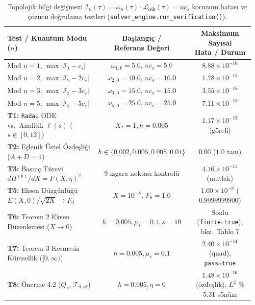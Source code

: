 \documentclass[12pt,a4paper]{article}
\begin{document}
\begin{table}[htbp]
\centering
\footnotesize
\setlength{\tabcolsep}{1pt}
\caption{Topolojik bilgi değişmezi $\mathcal{I}_n(\tau) = \omega_n(\tau) \cdot \mathcal{L}_{\mathrm{isik}}(\tau) = n c_s$ korunum hatası ve çözücü doğrulama testleri (\texttt{solver\_engine.run\_verification()}).}
\vspace{0.15cm}
\begin{tabularx}{\textwidth}{@{}X|c|c@{}}
\hline
Test / Kuantum Modu ($n$) & \shortstack{Başlangıç / \\ Referans Değeri} & \shortstack{Maksimum Sayısal \\ Hata / Durum} \\
\hline
Mod $n=1$, $\max|\mathcal{I}_1-c_s|$ & $\omega_{1,0} = 5.0$, $n c_s = 5.0$ & $8.88 \times 10^{-16}$ \\
Mod $n=2$, $\max|\mathcal{I}_2-2c_s|$ & $\omega_{2,0} = 10.0$, $n c_s = 10.0$ & $1.78 \times 10^{-15}$ \\
Mod $n=3$, $\max|\mathcal{I}_3-3c_s|$ & $\omega_{3,0} = 15.0$, $n c_s = 15.0$ & $3.55 \times 10^{-15}$ \\
Mod $n=5$, $\max|\mathcal{I}_5-5c_s|$ & $\omega_{5,0} = 25.0$, $n c_s = 25.0$ & $7.11 \times 10^{-15}$ \\
\hline
\textbf{T1:} \texttt{Radau} ODE vs.\ Analitik $\ell(s)$ ($s \in [0, 12]$) & $X_*=1, h=0.005$ & $1.17 \times 10^{-13}$ (göreli) \\
\textbf{T2:} Eşlenik Üstel Özdeşliği ($A + D = 1$) & $h \in \{0.002, 0.005, 0.008, 0.01\}$ & $0.00$ ($1.0$ tam) \\
\textbf{T3:} Basınç Türevi $d\Pi^{(0)}/dX = F(X,\eta)^2$ & 9 ızgara noktası kontrolü & $4.16 \times 10^{-11}$ (mutlak) \\
\textbf{T5:} Eksen Düzgünlüğü $E(X,0)/\sqrt{2X} \to F_0$ & $X = 10^{-8}$, $F_0 = 1.0$ & $1.00 \times 10^{-8}$ ($0.9999999900$) \\
\textbf{T6:} Teorem 2 Eksen Düzenlemesi ($X \to 0$) & $h=0.005, \mu_s=0.1, s=10$ & \shortstack{Sonlu (\texttt{finite=true}), \\ bkz.\ Tablo 7} \\
\textbf{T7:} Teorem 3 Kesmesiz Küresellik ($[0,\infty)$) & $h=0.005, \mu_s=0.1$ & \shortstack{$2.40 \times 10^{-14}$ (quad), \\ \texttt{pass=true}} \\
\textbf{T8:} Önerme 4.2 ($Q_s$, $\mathcal{T}_{0,r\theta}$) & $h=0.005, \eta=0$ & \shortstack{$1.48 \times 10^{-16}$ (özdeşlik), \\ $L^2$ \%$5.31$ sönüm} \\

\end{tabularx}
\end{table}
\end{document}

